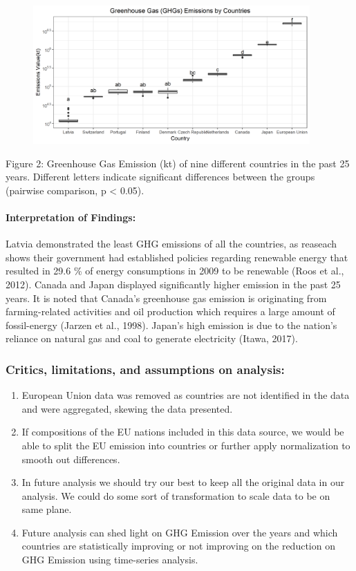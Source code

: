 \documentclass[]{article}
\providecommand{\tightlist}{%
  \setlength{\itemsep}{0pt}\setlength{\parskip}{0pt}}
\let\oldparagraph\paragraph
\renewcommand{\paragraph}[1]{\oldparagraph{#1}\mbox{}}
\begin{document}
\begin{figure}
\centering
\includegraphics[width=4.16667in]{../results/fig/GH_boxplot.png}
\caption{}
\end{figure}

Figure 2: Greenhouse Gas Emission (kt) of nine different countries in
the past 25 years. Different letters indicate significant differences
between the groups (pairwise comparison, p \textless{} 0.05).

\paragraph{Interpretation of
Findings:}\label{interpretation-of-findings}

Latvia demonstrated the least GHG emissions of all the countries, as
reaseach shows their government had established policies regarding
renewable energy that resulted in 29.6 \% of energy consumptions in 2009
to be renewable (Roos et al., 2012). Canada and Japan displayed
significantly higher emission in the past 25 years. It is noted that
Canada's greenhouse gas emission is originating from farming-related
activities and oil production which requires a large amount of
fossil-energy (Jarzen et al., 1998). Japan's high emission is due to the
nation's reliance on natural gas and coal to generate electricity
(Itawa, 2017).

\subsubsection{Critics, limitations, and assumptions on
analysis:}\label{critics-limitations-and-assumptions-on-analysis}

\begin{enumerate}
\def\labelenumi{\arabic{enumi}.}
\tightlist
\item
  European Union data was removed as countries are not identified in the
  data and were aggregated, skewing the data presented.
\item
  If compositions of the EU nations included in this data source, we
  would be able to split the EU emission into countries or further apply
  normalization to smooth out differences.
\item
  In future analysis we should try our best to keep all the original
  data in our analysis. We could do some sort of transformation to scale
  data to be on same plane.
\item
  Future analysis can shed light on GHG Emission over the years and
  which countries are statistically improving or not improving on the
  reduction on GHG Emission using time-series analysis.
\end{enumerate}
\end{document}
